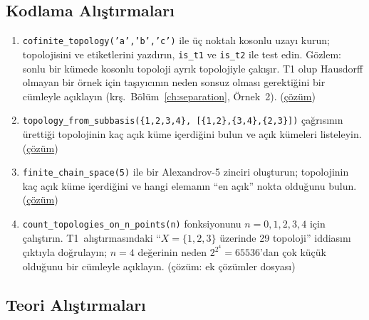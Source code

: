 \subsection*{Kodlama Alıştırmaları}

\begin{enumerate}[label=\textbf{K\arabic*.}]
  \item \label{ex:ch04:K1} \texttt{cofinite\_topology('a','b','c')} ile üç
        noktalı kosonlu uzayı kurun; topolojisini ve etiketlerini
        yazdırın, \texttt{is\_t1} ve \texttt{is\_t2} ile test edin.
        Gözlem: sonlu bir kümede kosonlu topoloji ayrık topolojiyle
        çakışır. T1 olup Hausdorff olmayan bir örnek için taşıyıcının
        neden sonsuz olması gerektiğini bir cümleyle açıklayın
        (krş.\ Bölüm~\ref{ch:separation}, Örnek~2).
        (\hyperref[sol:ch04:K1]{çözüm})

  \item \label{ex:ch04:K2} \texttt{topology\_from\_subbasis(\{1,2,3,4\},
        [\{1,2\},\{3,4\},\{2,3\}])} çağrısının ürettiği topolojinin kaç
        açık küme içerdiğini bulun ve açık kümeleri listeleyin.
        (\hyperref[sol:ch04:K2]{çözüm})

  \item \label{ex:ch04:K3} \texttt{finite\_chain\_space(5)} ile bir
        Alexandrov-5 zinciri oluşturun; topolojinin kaç açık küme
        içerdiğini ve hangi elemanın ``en açık'' nokta olduğunu bulun.
        (\hyperref[sol:ch04:K3]{çözüm})

  \item \label{ex:ch04:K4} \texttt{count\_topologies\_on\_n\_points(n)}
        fonksiyonunu $n=0,1,2,3,4$ için çalıştırın. T1~alıştırmasındaki
        ``$X=\{1,2,3\}$ üzerinde 29 topoloji'' iddiasını çıktıyla
        doğrulayın; $n=4$ değerinin neden $2^{2^4}=65536$'dan çok küçük
        olduğunu bir cümleyle açıklayın.
        (çözüm: ek çözümler dosyası)
\end{enumerate}

\subsection*{Teori Alıştırmaları}

